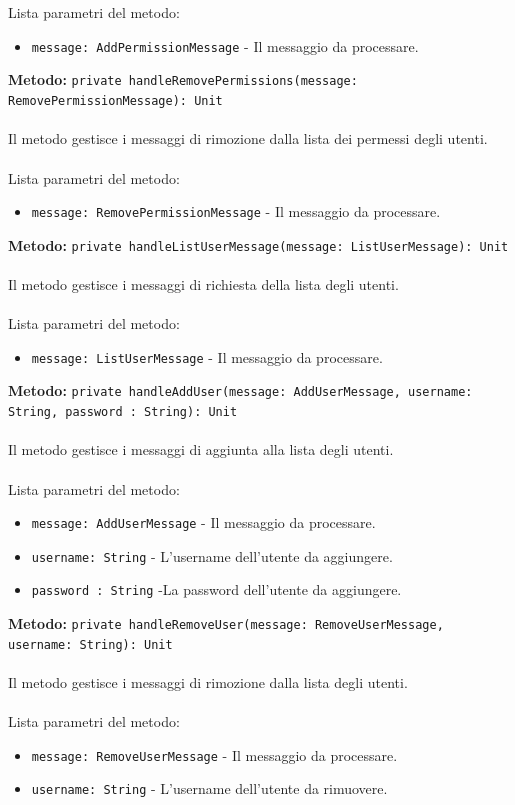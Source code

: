 \documentclass[a4paper]{article}
\begin{document}
			\\ \\
			Lista parametri del metodo:
			\begin{itemize}
				\item \texttt{message: AddPermissionMessage} - Il messaggio da processare.
			\end{itemize}	
		\textbf{Metodo: }\texttt{private handleRemovePermissions(message: RemovePermissionMessage): Unit}
			\\ \\
			Il metodo gestisce i messaggi di rimozione dalla lista dei permessi degli utenti.
			\\ \\
			Lista parametri del metodo:
			\begin{itemize}
				\item \texttt{message: RemovePermissionMessage} - Il messaggio da processare.
			\end{itemize}	
		\textbf{Metodo: }\texttt{private handleListUserMessage(message: ListUserMessage): Unit}
			\\ \\
			Il metodo gestisce i messaggi di richiesta della lista degli utenti.
			\\ \\
			Lista parametri del metodo:
			\begin{itemize}
				\item \texttt{message: ListUserMessage} - Il messaggio da processare.
			\end{itemize}	
		\textbf{Metodo: }\texttt{private handleAddUser(message: AddUserMessage, username: String, password : String): Unit}
			\\ \\
			Il metodo gestisce i messaggi di aggiunta alla lista degli utenti.
			\\ \\
			Lista parametri del metodo:
			\begin{itemize}
				\item \texttt{message: AddUserMessage} - Il messaggio da processare.
				\item \texttt{username: String} - L'username dell'utente da aggiungere.
				\item \texttt{password : String} -La password dell'utente da aggiungere.
			\end{itemize}	
		\textbf{Metodo: }\texttt{private handleRemoveUser(message: RemoveUserMessage, username: String): Unit}
			\\ \\
			Il metodo gestisce i messaggi di rimozione dalla lista degli utenti.
			\\ \\
			Lista parametri del metodo:
			\begin{itemize}
				\item \texttt{message: RemoveUserMessage} - Il messaggio da processare.
				\item \texttt{username: String} - L'username dell'utente da rimuovere.
			\end{itemize}
			
\end{document}
